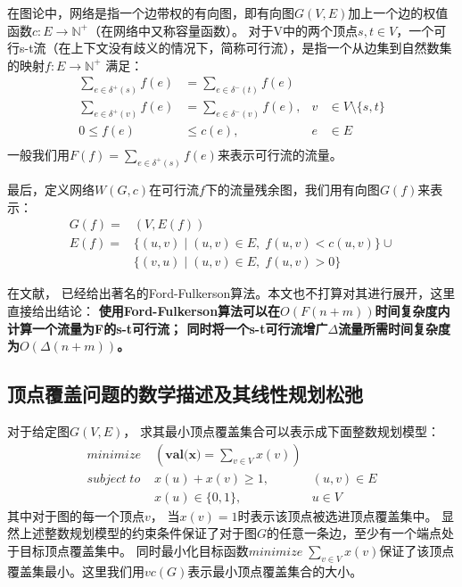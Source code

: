 在图论中，网络是指一个边带权的有向图，即有向图$G(V, E)$加上一个边的权值函数$c: E \rightarrow \mathbb{N}^+$（在网络中又称容量函数）。
对于V中的两个顶点$s, t \in V$，一个可行s-t流（在上下文没有歧义的情况下，简称可行流），是指一个从边集到自然数集的映射$f: E \rightarrow \mathbb{N}^+$ 满足：
\begin{equation} \label{EquationFlow} \begin{aligned}
  \sum_{e\in \delta^+(s)}{f(e)}&=\sum_{e\in \delta^-(t)}{f(e)}& \\
  \sum_{e\in \delta^+(v)}{f(e)}&=\sum_{e\in \delta^-(v)}{f(e)}, & v &\in V \setminus \{s, t\} \\
  0 \le f(e) &\le c(e), & e &\in E \\
\end{aligned} \end{equation}
一般我们用$F(f)=\sum_{e\in \delta^+(s)}{f(e)}$来表示可行流的流量。

最后，定义网络$W(G, c)$在可行流$f$下的流量残余图，我们用有向图$G(f)$来表示：
\begin{equation*} \begin{aligned}
  G(f) = &(V, E(f)) \\
  E(f) = &\{(u,v)\;|\;(u, v) \in E,\;f(u, v) < c(u, v)\} \cup \\
  &\{(v,u)\;|\;(u, v) \in E,\;f(u, v) > 0\}
\end{aligned} \end{equation*}

在文献\cite{ford1962flows}， 已经给出著名的Ford-Fulkerson算法。本文也不打算对其进行展开，这里直接给出结论：
\textbf{使用Ford-Fulkerson算法可以在$O(F(n + m))$时间复杂度内计算一个流量为F的s-t可行流；
同时将一个s-t可行流增广$\Delta$流量所需时间复杂度为$O(\Delta(n + m))$。}

\subsection{顶点覆盖问题的数学描述及其线性规划松弛}
对于给定图$G(V, E)$， 求其最小顶点覆盖集合可以表示成下面整数规划模型：
\begin{equation} \label{ModelVC} \begin{aligned}
  minimize\; & (\textbf{val(x)} = \sum_{v \in V}{x(v)}) &\\
  subject\; to\; & x(u) + x(v) \ge 1, &(u, v) \in E \\
   & x(u) \in \{0, 1\}, & u \in V
\end{aligned} \end{equation}
其中对于图的每一个顶点$v$， 当$x(v) = 1$时表示该顶点被选进顶点覆盖集中。
显然上述整数规划模型的约束条件保证了对于图$G$的任意一条边，至少有一个端点处于目标顶点覆盖集中。
同时最小化目标函数$minimize\; \sum_{v \in V}{x(v)}$保证了该顶点覆盖集最小。这里我们用$vc(G)$表示最小顶点覆盖集合的大小。

